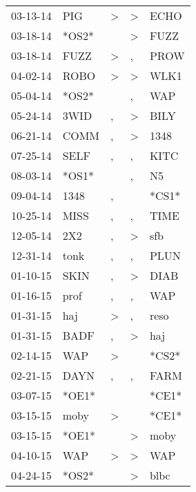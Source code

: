 \begin{supertabular}{lllll}
 03-13-14 &    PIG &     \textgreater &     \textgreater &   ECHO \\
 03-18-14 &  *OS2* &                  &     \textgreater &   FUZZ \\
 03-18-14 &   FUZZ &     \textgreater &                , &   PROW \\
 04-02-14 &   ROBO &     \textgreater &     \textgreater &   WLK1 \\
 05-04-14 &  *OS2* &                  &                , &    WAP \\
 05-24-14 &   3WID &                , &     \textgreater &   BILY \\
 06-21-14 &   COMM &                , &     \textgreater &   1348 \\
 07-25-14 &   SELF &                , &                , &   KITC \\
 08-03-14 &  *OS1* &                  &                , &     N5 \\
 09-04-14 &   1348 &                , &                  &  *CS1* \\
 10-25-14 &   MISS &                , &                , &   TIME \\
 12-05-14 &    2X2 &                , &     \textgreater &    sfb \\
 12-31-14 &   tonk &                , &                , &   PLUN \\
 01-10-15 &   SKIN &                , &     \textgreater &   DIAB \\
 01-16-15 &   prof &                , &                , &    WAP \\
 01-31-15 &    haj &     \textgreater &                , &   reso \\
 01-31-15 &   BADF &                , &     \textgreater &    haj \\
 02-14-15 &    WAP &     \textgreater &                  &  *CS2* \\
 02-21-15 &   DAYN &                , &                , &   FARM \\
 03-07-15 &  *OE1* &                  &                  &  *CE1* \\
 03-15-15 &   moby &     \textgreater &                  &  *CE1* \\
 03-15-15 &  *OE1* &                  &     \textgreater &   moby \\
 04-10-15 &    WAP &     \textgreater &     \textgreater &    WAP \\
 04-24-15 &  *OS2* &                  &     \textgreater &   blbc \\

\end{supertabular}
